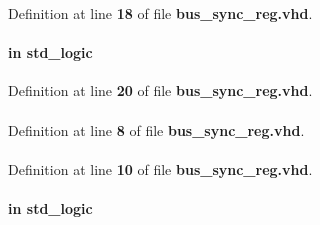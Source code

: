 Definition at line {\bf 18} of file {\bf bus\+\_\+sync\+\_\+reg.\+vhd}.

\paragraph[{clk}]{ {\bfseries \textcolor{keywordflow}{in}\textcolor{vhdlchar}{ }} {\bfseries \textcolor{comment}{std\+\_\+logic}\textcolor{vhdlchar}{ }} \hspace{0.3cm}{\ttfamily [Port]}}\label{classbus__sync__reg_a4a4609c199d30b3adebbeb3a01276ec5}


Definition at line {\bf 20} of file {\bf bus\+\_\+sync\+\_\+reg.\+vhd}.

\paragraph[{ieee}]{\hspace{0.3cm}{\ttfamily [Library]}}\label{classbus__sync__reg_a0a6af6eef40212dbaf130d57ce711256}


Definition at line {\bf 8} of file {\bf bus\+\_\+sync\+\_\+reg.\+vhd}.

\paragraph[{numeric\+\_\+std}]{\hspace{0.3cm}{\ttfamily [Package]}}\label{classbus__sync__reg_a2edc34402b573437d5f25fa90ba4013e}


Definition at line {\bf 10} of file {\bf bus\+\_\+sync\+\_\+reg.\+vhd}.

\paragraph[{reset\+\_\+n}]{ {\bfseries \textcolor{keywordflow}{in}\textcolor{vhdlchar}{ }} {\bfseries \textcolor{comment}{std\+\_\+logic}\textcolor{vhdlchar}{ }} \hspace{0.3cm}{\ttfamily [Port]}}\label{classbus__sync__reg_a446ea52ed8c4a84181a47d9165ce41a5}


